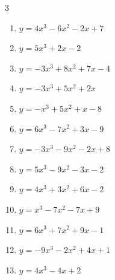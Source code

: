 \begin{multicols}{3}
\begin{enumerate}
  \item $y=4x^{3}-6x^{2}-2x+7$


  \item $y=5x^{3}+2x-2$


  \item $y=-3x^{3}+8x^{2}+7x-4$


  \item $y=-3x^{3}+5x^{2}+2x$


\columnbreak %

  \item $y=-x^{3}+5x^{2}+x-8$


  \item $y=6x^{3}-7x^{2}+3x-9$


  \item $y=-3x^{3}-9x^{2}-2x+8$


  \item $y=5x^{3}-9x^{2}-3x-2$


  \item $y=4x^{3}+3x^{2}+6x-2$


  \item $y=x^{3}-7x^{2}-7x+9$


  \item $y=6x^{3}+7x^{2}+9x-1$


  \item $y=-9x^{3}-2x^{2}+4x+1$


  \item $y=4x^{3}-4x+2$


\end{enumerate}
\end{multicols}
